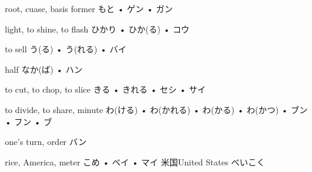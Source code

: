 



\setcounter{cardnum}{73}

		{root, cuase, basis former}
		{もと • ゲン • ガン}
		{}{}
		{}{}
		{}{}
		{}{}
		{}{}

		{light, to shine, to flash}
		{ひかり • ひか(る) • コウ}
		{}{}
		{}{}
		{}{}
		{}{}
		{}{}

		{to sell}
		{う(る) • う(れる) • バイ}
		{}{}
		{}{}
		{}{}
		{}{}
		{}{}

		{half}
		{なか(ば) • ハン}
		{}{}
		{}{}
		{}{}
		{}{}
		{}{}

		{to cut, to chop, to slice}
		{きる • きれる • セシ • サイ}
		{}{}
		{}{}
		{}{}
		{}{}
		{}{}

		{to divide, to share, minute}
		{わ(ける) • わ(かれる) • わ(かる) • わ(かつ) • ブン • フン • ブ}
		{}{}
		{}{}
		{}{}
		{}{}
		{}{}

		{one's turn, order}
		{バン}
		{}{}
		{}{}
		{}{}
		{}{}
		{}{}

		{rice, America, meter}
		{こめ • ベイ • マイ}
		{米国}{United States べいこく}
		{}{}
		{}{}
		{}{}
		{}{}

